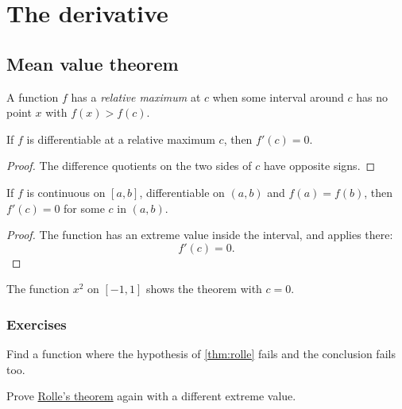 \chapter{The derivative}

\section{Mean value theorem}
\label{sec:mvt}

\begin{defn}
A function $f$ has a \emph{relative maximum} at $c$ when some interval
around $c$ has no point $x$ with $f(x) > f(c)$.
\end{defn}

\begin{lemma} \label{lemma:relmaxdzero}
If $f$ is differentiable at a relative maximum $c$, then $f'(c) = 0$.
\end{lemma}

\begin{proof}
The difference quotients on the two sides of $c$ have opposite signs.
\end{proof}

\begin{thm}[Rolle]
\label{thm:rolle}
If $f$ is continuous on $[a,b]$, differentiable on $(a,b)$ and $f(a) = f(b)$,
then $f'(c) = 0$ for some $c$ in $(a,b)$.
\end{thm}

\begin{proof}
The function has an extreme value inside the interval, and
 applies there:
\begin{equation}
\label{eq:rolle-zero}
f'(c) = 0 .
\end{equation}
\end{proof}

\begin{example}
The function $x^2$ on $[-1,1]$ shows the theorem with $c = 0$.
\end{example}

\subsection{Exercises}

\begin{exercise}
Find a function where the hypothesis of \ref{thm:rolle} fails and the
conclusion fails too.
\end{exercise}

\begin{exercise}
Prove \hyperref[thm:rolle]{Rolle's theorem} again with a different extreme value.
\end{exercise}
